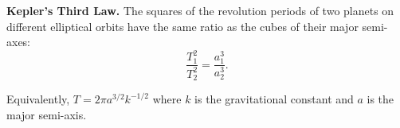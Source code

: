 \textbf{Kepler's Third Law.} The squares of the revolution periods of two planets on different elliptical orbits have the same ratio as the cubes of their major semi-axes:
$$\frac{T_1^2}{T_2^2} = \frac{a_1^3}{a_2^3}.$$

Equivalently, $T = 2\pi a^{3/2} k^{-1/2}$ where $k$ is the gravitational constant and $a$ is the major semi-axis.
